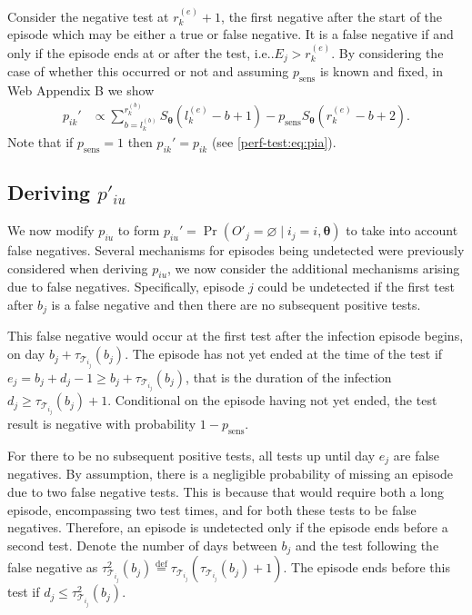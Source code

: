 \documentclass[referee,useAMS,usenatbib]{biom}
\makeatletter
\DeclareMathOperator{\prob}{\mathrm{Pr}}
\renewcommand{\vec}[1]{\bm{#1}}
\newcommand{\psens}{p_\text{sens}}
\newcommand{\sched}{\mathcal{T}}
\DeclareRobustCommand\onedot{\futurelet\@let@token\@onedot}
\def\@onedot{\ifx\@let@token.\else.\null\fi\xspace}
\def\ie{i.e\onedot} \def\Ie{{I.e}\onedot}
\makeatother
\begin{document}
Consider the negative test at $r_k^{(e)}+1$, the first negative after the start of the episode which may be either a true or false negative.
It is a false negative if and only if the episode ends at or after the test, \ie $E_j > r_k^{(e)}$.
By considering the case of whether this occurred or not and assuming $\psens$ is known and fixed, in Web Appendix B we show
\begin{align}
p_{ik}'
&\propto \sum_{b = l_k^{(b)}}^{r_k^{(b)}} S_{\vec{\theta}}(l_k^{(e)} - b + 1) - p_\text{sens} S_{\vec{\theta}}(r_k^{(e)} - b + 2).
\label{imperf-test:eq:pia-prime-constant}
\end{align}
Note that if $p_\text{sens} = 1$ then $p_{ik}' = p_{ik}$ (see \cref{perf-test:eq:pia}).

\subsection{Deriving $p'_{iu}$} \label{imperf-test:sec:modifying-p_iu}

We now modify $p_{iu}$ to form $p_{iu}' = \prob(O'_j = \varnothing \mid i_j = i, \vec{\theta})$ to take into account false negatives.
Several mechanisms for episodes being undetected were previously considered when deriving $p_{iu}$, we now consider the additional mechanisms arising due to false negatives.
Specifically, episode $j$ could be undetected if the first test after $b_j$ is a false negative and then there are no subsequent positive tests.

This false negative would occur at the first test after the infection episode begins, on day $b_j + \tau_{\sched_{i_j}}(b_j)$.
The episode has not yet ended at the time of the test if $e_j = b_j + d_j - 1 \geq b_j + \tau_{\sched_{i_j}}(b_j)$, that is the duration of the infection $d_j \geq \tau_{\sched_{i_j}}(b_j) + 1$.
Conditional on the episode having not yet ended, the test result is negative with probability $1 - \psens$.

For there to be no subsequent positive tests, all tests up until day $e_j$ are false negatives.
By assumption, there is a negligible probability of missing an episode due to two false negative tests.
This is because that would require both a long episode, encompassing two test times, and for both these tests to be false negatives.
Therefore, an episode is undetected only if the episode ends before a second test.
Denote the number of days between $b_j$ and the test following the false negative as $\tau^2_{\sched_{i_j}}(b_j) \stackrel{\text{def}}{=} \tau_{\sched_{i_j}}(\tau_{\sched_{i_j}}(b_j) + 1)$.
The episode ends before this test if $d_j \leq \tau^2_{\sched_{i_j}}(b_j)$.
\end{document}
